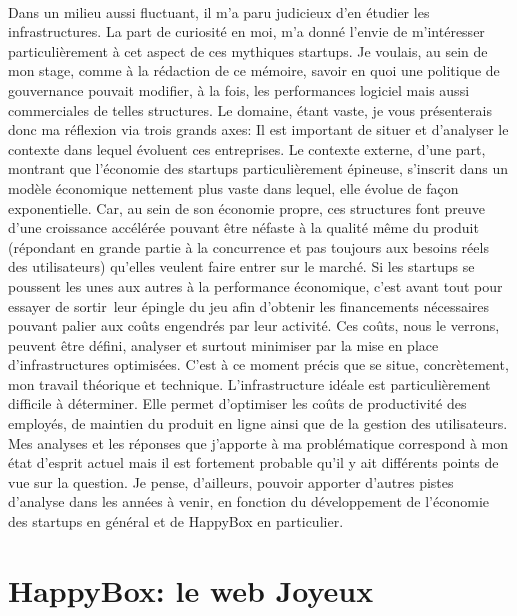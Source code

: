\documentclass[11pt, a4paper ]{article}
\let\stdsection\section
\renewcommand\section{\newpage\stdsection}
\begin{document}
\begin{spacing}{1.5}
\paragraph{}
Dans un milieu aussi fluctuant, il m'a paru judicieux d'en étudier les infrastructures. La part de curiosité en moi, m'a donné l'envie de m'intéresser particulièrement à cet aspect de ces mythiques startups. Je voulais, au sein de mon stage, comme à la rédaction de ce mémoire, savoir en quoi une politique de gouvernance pouvait modifier, à la fois, les performances logiciel mais aussi commerciales de telles structures. Le domaine, étant vaste, je vous présenterais donc ma réflexion via trois grands axes:
Il est important de situer et d'analyser le contexte dans lequel évoluent ces entreprises. Le contexte externe, d'une part, montrant que l'économie des startups particulièrement épineuse, s'inscrit dans un modèle économique nettement plus vaste dans lequel, elle évolue de façon exponentielle. Car, au sein de son économie propre, ces structures font preuve d'une croissance accélérée pouvant être néfaste à la qualité même du produit (répondant en grande partie à la concurrence et pas toujours aux besoins réels des utilisateurs) qu'elles veulent faire entrer sur le marché.
Si les startups se poussent les unes aux autres à la performance économique, c'est avant tout pour essayer de sortir leur épingle du jeu afin d'obtenir les financements nécessaires pouvant palier aux coûts engendrés par leur activité. Ces coûts, nous le verrons, peuvent être défini, analyser et surtout minimiser par la mise en place d’infrastructures optimisées.
C'est à ce moment précis que se situe, concrètement, mon travail théorique et technique. L'infrastructure idéale est particulièrement difficile à déterminer. Elle permet d'optimiser les coûts de productivité des employés, de maintien du produit en ligne ainsi que de la gestion des utilisateurs.
Mes analyses et les réponses que j'apporte à ma problématique correspond à mon état d'esprit actuel mais il est fortement probable qu'il y ait différents points de vue sur la question. Je pense, d'ailleurs, pouvoir apporter d'autres pistes d'analyse dans les années à venir, en fonction du développement de l'économie des startups en général et de HappyBox en particulier.






	\section{HappyBox: le web Joyeux} %


\end{spacing}
\end{document}
